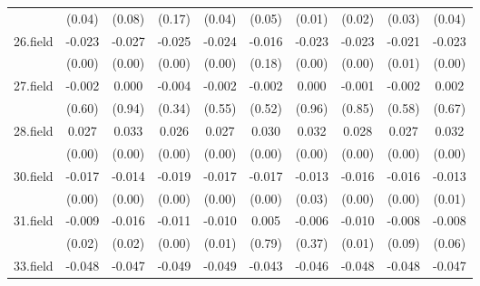 {\begin{tabular}{l*{9}{c}}
          &   (0.04)         &   (0.08)         &   (0.17)         &   (0.04)         &   (0.05)         &   (0.01)         &   (0.02)         &   (0.03)         &   (0.04)         \\
[1em]
26.field  &   -0.023\sym{***}&   -0.027\sym{***}&   -0.025\sym{***}&   -0.024\sym{***}&   -0.016         &   -0.023\sym{***}&   -0.023\sym{***}&   -0.021\sym{**} &   -0.023\sym{***}\\
          &   (0.00)         &   (0.00)         &   (0.00)         &   (0.00)         &   (0.18)         &   (0.00)         &   (0.00)         &   (0.01)         &   (0.00)         \\
[1em]
27.field  &   -0.002         &    0.000         &   -0.004         &   -0.002         &   -0.002         &    0.000         &   -0.001         &   -0.002         &    0.002         \\
          &   (0.60)         &   (0.94)         &   (0.34)         &   (0.55)         &   (0.52)         &   (0.96)         &   (0.85)         &   (0.58)         &   (0.67)         \\
[1em]
28.field  &    0.027\sym{***}&    0.033\sym{***}&    0.026\sym{***}&    0.027\sym{***}&    0.030\sym{***}&    0.032\sym{***}&    0.028\sym{***}&    0.027\sym{***}&    0.032\sym{***}\\
          &   (0.00)         &   (0.00)         &   (0.00)         &   (0.00)         &   (0.00)         &   (0.00)         &   (0.00)         &   (0.00)         &   (0.00)         \\
[1em]
30.field  &   -0.017\sym{***}&   -0.014\sym{**} &   -0.019\sym{***}&   -0.017\sym{***}&   -0.017\sym{***}&   -0.013\sym{*}  &   -0.016\sym{***}&   -0.016\sym{***}&   -0.013\sym{*}  \\
          &   (0.00)         &   (0.00)         &   (0.00)         &   (0.00)         &   (0.00)         &   (0.03)         &   (0.00)         &   (0.00)         &   (0.01)         \\
[1em]
31.field  &   -0.009\sym{*}  &   -0.016\sym{*}  &   -0.011\sym{**} &   -0.010\sym{*}  &    0.005         &   -0.006         &   -0.010\sym{**} &   -0.008         &   -0.008         \\
          &   (0.02)         &   (0.02)         &   (0.00)         &   (0.01)         &   (0.79)         &   (0.37)         &   (0.01)         &   (0.09)         &   (0.06)         \\
[1em]
33.field  &   -0.048\sym{***}&   -0.047\sym{***}&   -0.049\sym{***}&   -0.049\sym{***}&   -0.043\sym{***}&   -0.046\sym{***}&   -0.048\sym{***}&   -0.048\sym{***}&   -0.047\sym{***}\\

\end{tabular}}
